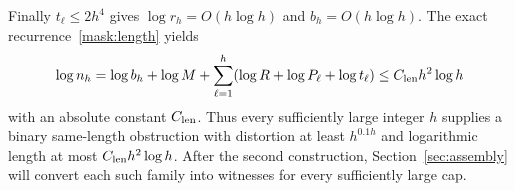 Finally $t_\ell\leq2h^4$ gives $\log r_h=O(h\log h)$ and
$b_h=O(h\log h)$. The exact recurrence~\eqref{mask:length} yields
\begin{equation}\label{mask:length-bound}
 \log n_h=\log b_h+\log M+
 \sum_{\ell=1}^h(\log R+\log P_\ell+\log t_\ell)
 \leq C_{\rm len}h^2\log h
\end{equation}
with an absolute constant $C_{\rm len}$. Thus every sufficiently large
integer $h$ supplies a binary same-length obstruction with distortion at
least $h^{0.1h}$ and logarithmic length at most $C_{\rm len}h^2\log h$.
After the second construction, Section~\ref{sec:assembly} will convert each
such family into witnesses for every sufficiently large cap.
